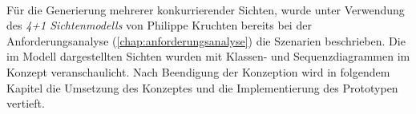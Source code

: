 \\
Für die Generierung mehrerer konkurrierender Sichten, wurde unter Verwendung des \textit{4+1 Sichtenmodells} von Philippe Kruchten \cite{Kruchten1995}
bereits bei der Anforderungsanalyse (\ref{chap:anforderungsanalyse}) die Szenarien beschrieben. Die im Modell dargestellten Sichten wurden mit 
Klassen- und Sequenzdiagrammen %
im Konzept veranschaulicht. Nach Beendigung der Konzeption wird in folgendem Kapitel die Umsetzung des Konzeptes und die 
Implementierung des Prototypen vertieft. 
